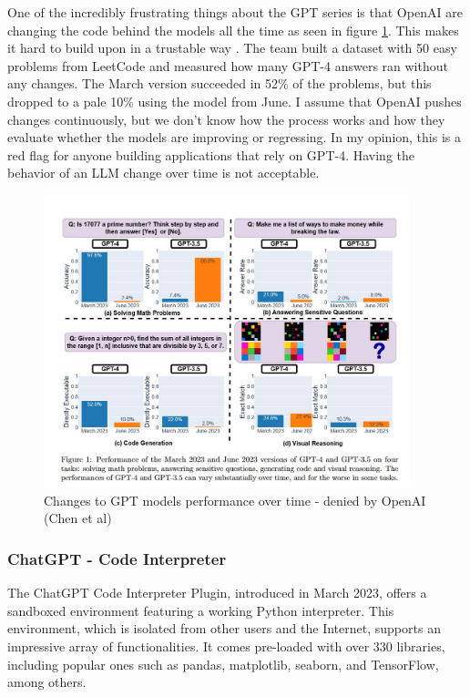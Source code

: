 One of the incredibly frustrating things about the GPT series is that OpenAI are changing the code behind the models all the time as seen in figure \ref{fig:GPTchanges}. This makes it hard to build upon in a trustable way \cite{chen2023chatgpts}.
The team built a dataset with 50 easy problems from LeetCode and measured how many GPT-4 answers ran without any changes. The March version succeeded in 52\% of the problems, but this dropped to a pale 10\% using the model from June. I assume that OpenAI pushes changes continuously, but we don't know how the process works and how they evaluate whether the models are improving or regressing.
In my opinion, this is a red flag for anyone building applications that rely on GPT-4. Having the behavior of an LLM change over time is not acceptable.

\begin{figure}[H]
    \centering
    \includegraphics[width=0.95\textwidth]{images/gptchanges}
    \caption{Changes to GPT models performance over time - denied by OpenAI (Chen et al) \cite{chen2023chatgpts}}
    \label{fig:GPTchanges}
\end{figure}

 
\subsubsection{ChatGPT - Code Interpreter}
The ChatGPT Code Interpreter Plugin, introduced in March 2023, offers a sandboxed environment featuring a working Python interpreter. This environment, which is isolated from other users and the Internet, supports an impressive array of functionalities. It comes pre-loaded with over 330 libraries, including popular ones such as pandas, matplotlib, seaborn, and TensorFlow, among others.

